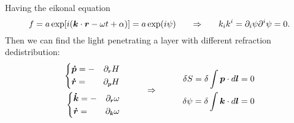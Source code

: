 Having the eikonal equation 
\begin{equation*}
	f = a \exp [i (\mbox{\boldmath $k$} \cdot\mbox{\boldmath $r$} - \omega t + \alpha)] = a \exp (i \psi)
	\hspace{0.6 cm}
	\Rightarrow
	\hspace{0.6 cm}
	k_i k^i = \partial_i \psi \partial^i \psi = 0.
\end{equation*}
Then we can find the light penetrating a layer with different refraction dedistribution:
\begin{equation*}
	\begin{aligned}
		\left\{
		\begin{aligned}
			&\vc{\dot{p}} = - &\partial_{\smallvc{r}} H\\
			&\vc{\dot{r}} = &\partial_{\smallvc{p}} H
		\end{aligned}\right.	\\
		\left\{
		\begin{aligned}
			&\vc{\dot{k}} = -&\partial_{\smallvc{r}} \omega\\
			&\vc{\dot{r}} = &\partial_{\smallvc{k}} \omega
		\end{aligned}\right.
	\end{aligned}
	\hspace{1 cm}
	\Rightarrow
	\hspace{1 cm}
	\begin{aligned}
		\delta S = \delta \int \vc{p} \cdot d \vc{l} = 0\\
		\delta \psi = \delta \int \vc{k} \cdot d \vc{l} = 0
	\end{aligned}
\end{equation*}